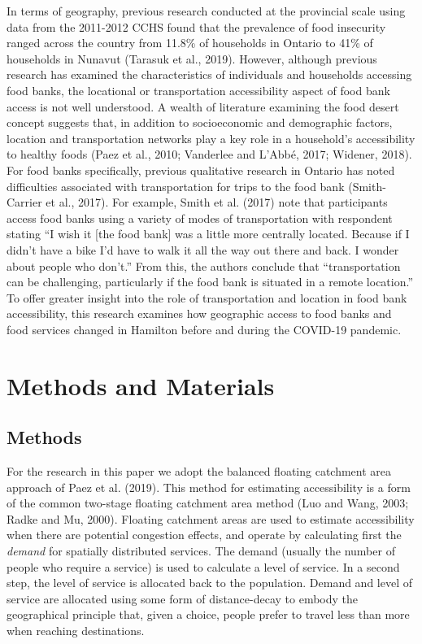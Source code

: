 \documentclass[]{elsarticle} %
\begin{document}
In terms of geography, previous research conducted at the provincial
scale using data from the 2011-2012 CCHS found that the prevalence of
food insecurity ranged across the country from 11.8\% of households in
Ontario to 41\% of households in Nunavut (Tarasuk et al., 2019).
However, although previous research has examined the characteristics of
individuals and households accessing food banks, the locational or
transportation accessibility aspect of food bank access is not well
understood. A wealth of literature examining the food desert concept
suggests that, in addition to socioeconomic and demographic factors,
location and transportation networks play a key role in a household's
accessibility to healthy foods (Paez et al., 2010; Vanderlee and L'Abbé,
2017; Widener, 2018). For food banks specifically, previous qualitative
research in Ontario has noted difficulties associated with
transportation for trips to the food bank (Smith-Carrier et al., 2017).
For example, Smith et al. (2017) note that participants access food
banks using a variety of modes of transportation with respondent stating
``I wish it {[}the food bank{]} was a little more centrally located.
Because if I didn't have a bike I'd have to walk it all the way out
there and back. I wonder about people who don't.'' From this, the
authors conclude that ``transportation can be challenging, particularly
if the food bank is situated in a remote location.'' To offer greater
insight into the role of transportation and location in food bank
accessibility, this research examines how geographic access to food
banks and food services changed in Hamilton before and during the
COVID-19 pandemic.

\hypertarget{methods-and-materials}{%
\section{Methods and Materials}\label{methods-and-materials}}

\hypertarget{methods}{%
\subsection{Methods}\label{methods}}

For the research in this paper we adopt the balanced floating catchment
area approach of Paez et al. (2019). This method for estimating
accessibility is a form of the common two-stage floating catchment area
method (Luo and Wang, 2003; Radke and Mu, 2000). Floating catchment
areas are used to estimate accessibility when there are potential
congestion effects, and operate by calculating first the \emph{demand}
for spatially distributed services. The demand (usually the number of
people who require a service) is used to calculate a level of service.
In a second step, the level of service is allocated back to the
population. Demand and level of service are allocated using some form of
distance-decay to embody the geographical principle that, given a
choice, people prefer to travel less than more when reaching
destinations.
\end{document}
